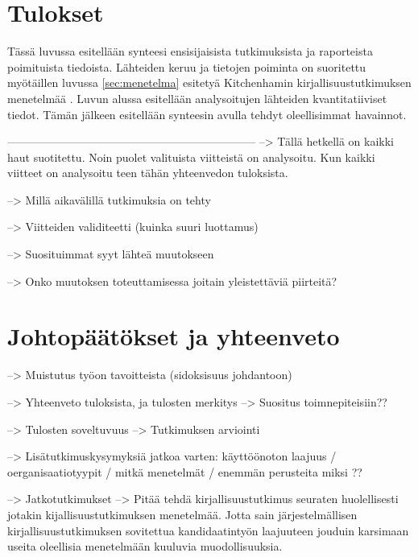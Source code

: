
\section{Tulokset}
\label{sec:tulokset}

Tässä luvussa esitellään synteesi ensisijaisista tutkimuksista ja raporteista
poimituista tiedoista. Lähteiden keruu ja tietojen poiminta on suoritettu
myötäillen luvussa \ref{sec:menetelma} esitetyä Kitchenhamin
kirjallisuustutkimuksen menetelmää \citep{Kitchenham2007}. Luvun alussa
esitellään analysoitujen lähteiden kvantitatiiviset tiedot. Tämän jälkeen
esitellään synteesin avulla tehdyt oleellisimmat havainnot.

\vspace{1cm}
------------------------------------------------------------------\newline
--> Tällä hetkellä on kaikki haut suotitettu. Noin puolet valituista viitteistä
on analysoitu. Kun kaikki viitteet on analysoitu teen tähän yhteenvedon
tuloksista.

--> Millä aikavälillä tutkimuksia on tehty

--> Viitteiden validiteetti (kuinka suuri luottamus)

--> Suosituimmat syyt lähteä muutokseen

--> Onko muutoksen toteuttamisessa joitain yleistettäviä piirteitä?


\section{Johtopäätökset ja yhteenveto}
\label{sec:johtopaatokset}

--> Muistutus työon tavoitteista (sidoksisuus johdantoon)

--> Yhteenveto tuloksista, ja tulosten merkitys
--> Suositus toimnepiteisiin??

--> Tulosten soveltuvuus
--> Tutkimuksen arviointi

--> Lisätutkimuskysymyksiä jatkoa varten: käyttöönoton laajuus /
oerganisaatiotyypit / mitkä menetelmät / enemmän perusteita miksi ?? 

--> Jatkotutkimukset
--> Pitää tehdä kirjallisuustutkimus seuraten huolellisesti jotakin
kijallisuustutkimuksen menetelmää. Jotta sain järjestelmällisen
kirjallisuustutkimuksen sovitettua kandidaatintyön laajuuteen jouduin
karsimaan useita oleellisia menetelmään kuuluvia muodollisuuksia.


